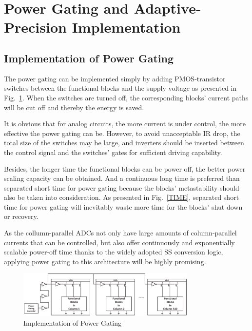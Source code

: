 \section{Power Gating and Adaptive-Precision Implementation}\label{strategy}

\subsection{Implementation of Power Gating}

The power gating can be implemented simply by adding PMOS-transistor switches between the functional blocks and the supply voltage \cite{keating_low_2007} as presented in Fig.~\ref{GATING}. 
When the switches are turned off, the corresponding blocks’ current paths will be cut off and thereby the energy is saved. 

It is obvious that for analog circuits, the more current is under control, the more effective the power gating can be. However, to avoid unacceptable IR drop, the total size of the switches may be large, 
and inverters should be inserted between the control signal and the switches’ gates for sufficient driving capability. 

Besides, the longer time the functional blocks can be power off, the better power scaling capacity can be obtained. And a continuous long time is preferred than separated short time for power gating because the blocks' metastability should also be taken into consideration.
As presented in Fig.~\ref{TIME}, separated short time for power gating will inevitably waste more
time for the blocks' shut down or recovery. 

As the collumn-parallel ADCs not only have large amounts of column-parallel currents that can be controlled, but also offer continuously and exponentially scalable power-off time thanks to the widely adopted SS conversion logic, applying power gating to this architecture will be highly promising.

\begin{figure}[htbp]
	\centerline{\includegraphics[width=3.5in]{./Figures/GATING.eps}}
	\caption{Implementation of Power Gating}
	\label{GATING}
\end{figure} 

